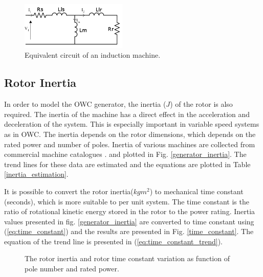 \documentclass[twocolumn]{article}
\begin{document}
  \begin{figure}
    \centering
    \includegraphics[width=0.45\textwidth]{equivalent_circuit}
    \caption{Equivalent circuit of an induction machine.} 
    \label{equivalent_circuit}
  \end{figure}


\subsection{Rotor Inertia}
In order to model the OWC generator, the inertia ($J$) of the rotor is also required. The inertia of the machine has a direct effect in the acceleration and deceleration of the system. This is especially important in variable speed systems as in OWC. The inertia depends on the rotor dimensions, which depends on the rated power and number of poles. Inertia of various machines are collected from commercial machine catalogues \cite{Siemens2012}. and plotted in Fig. \ref{generator_inertia}. The trend lines for these data are estimated and the equations are plotted in Table \ref{inertia_estimation}.

It is possible to convert the rotor inertia($kgm^2$) to mechanical time constant (seconds), which is more suitable to per unit system.  The time constant is the ratio of rotational kinetic energy stored in the rotor to the power rating. Inertia values presented in fig. \ref{generator_inertia} are converted to time constant using (\ref{eq:time_constant}) and the results are presented in Fig. \ref{time_constant}. The equation of the trend line is presented in (\ref{eq:time_constant_trend}).


\begin{figure}[]
  \centering

    \caption{The rotor inertia and rotor time constant variation as function of pole number and rated power.} 
    \label{inertia_timeconstant}
\end{figure}
\end{document}
